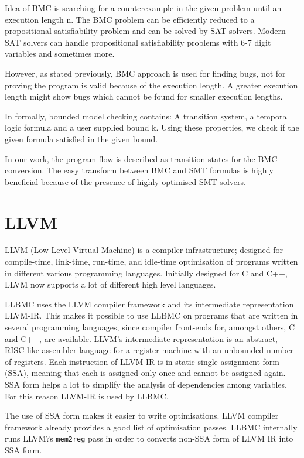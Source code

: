\documentclass[14pt]{article}
\begin{document}
Idea of BMC is searching for a counterexample in the given problem until an execution length n. The BMC problem can be efficiently reduced to a propositional satisfiability problem and can be solved by SAT solvers. Modern SAT solvers can handle propositional satisfiability problems with 6-7 digit variables and sometimes more.
					
However, as stated previously, BMC approach is used for finding bugs, not for proving the program is valid because of the execution length. A greater execution length might show bugs which cannot be found for smaller execution lengths.
					
In formally, bounded model checking contains: A transition system, a temporal logic formula and a user supplied bound k. Using these properties, we check if the given formula satisfied in the given bound.
					
In our work, the program flow is described as transition states for the BMC conversion. The easy transform between BMC and SMT formulas is highly beneficial because of the presence of highly optimised SMT solvers.

\section{LLVM}
LLVM (Low Level Virtual Machine)   \cite{llvm} is a compiler infrastructure; designed for compile-time, link-time, run-time, and idle-time optimisation of programs written in different various programming languages. Initially designed for C and C++, LLVM now supports a lot of different high level languages.

LLBMC uses the LLVM compiler framework and its intermediate representation LLVM-IR. This makes it possible to use LLBMC
on programs that are written in several programming languages, since compiler front-ends for, amongst others, C and C++, are available. LLVM's intermediate representation is an abstract, RISC-like assembler language for a register machine with an unbounded number of registers. Each instruction of LLVM-IR is in static single assignment form (SSA), meaning that each is assigned only once and cannot be assigned again. SSA form helps a lot to simplify the analysis of dependencies among variables. For this reason LLVM-IR is used by LLBMC.

The use of SSA form makes it easier to write optimisations. LLVM compiler framework already provides a good list of optimisation passes.  LLBMC internally runs LLVM?s \texttt{mem2reg} pass in order to converts non-SSA form of LLVM IR into SSA form. 
\end{document}
